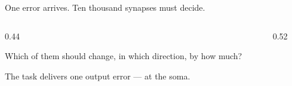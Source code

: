 \begin{frame}{One error arrives. Ten thousand synapses must decide.}
  \begin{columns}[c,onlytextwidth]
    \begin{column}{0.44\textwidth}
      \vspace{0.34cm}
      {\small Which of them should change, in which direction, by how
       much?\par}
      \vspace{0.22cm}
      {\footnotesize\color{Mute}The task delivers one output error --- at the
       soma.\par}
    \end{column}
    \begin{column}{0.52\textwidth}
      \centering
      \CreditTree[mode=plain,scale=1.18,stagelabel={one output error arrives at the soma}]
    \end{column}
  \end{columns}
  \vfill
  \vspace{0.04cm}
\end{frame}

